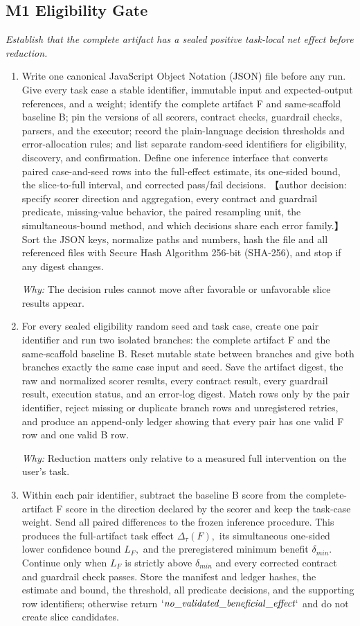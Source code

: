 \documentclass[10pt,a4paper]{article}
\begin{document}
\subsection*{M1 Eligibility Gate}
\emph{Establish that the complete artifact has a sealed positive task-local net effect before reduction.}
\begin{enumerate}[leftmargin=*,start=1]
  \item Write one canonical JavaScript Object Notation (JSON) file before any run. Give every task case a stable identifier, immutable input and expected-output references, and a weight;\allowbreak{} identify the complete artifact F and same-scaffold baseline B;\allowbreak{} pin the versions of all scorers, contract checks, guardrail checks, parsers, and the executor;\allowbreak{} record the plain-language decision thresholds and error-allocation rules;\allowbreak{} and list separate random-seed identifiers for eligibility, discovery, and confirmation. Define one inference interface that converts paired case-and-seed rows into the full-effect estimate, its one-sided bound, the slice-to-full interval, and corrected pass/fail decisions. 【author decision: specify scorer direction and aggregation, every contract and guardrail predicate, missing-value behavior, the paired resampling unit, the simultaneous-bound method, and which decisions share each error family.】 Sort the JSON keys, normalize paths and numbers, hash the file and all referenced files with Secure Hash Algorithm 256-bit (SHA-256), and stop if any digest changes.
\par\emph{Why:} The decision rules cannot move after favorable or unfavorable slice results appear.
  \item For every sealed eligibility random seed and task case, create one pair identifier and run two isolated branches: the complete artifact F and the same-scaffold baseline B. Reset mutable state between branches and give both branches exactly the same case input and seed. Save the artifact digest, the raw and normalized scorer results, every contract result, every guardrail result, execution status, and an error-log digest. Match rows only by the pair identifier, reject missing or duplicate branch rows and unregistered retries, and produce an append-only ledger showing that every pair has one valid F row and one valid B row.
\par\emph{Why:} Reduction matters only relative to a measured full intervention on the user's task.
  \item Within each pair identifier, subtract the baseline B score from the complete-artifact F score in the direction declared by the scorer and keep the task-case weight. Send all paired differences to the frozen inference procedure. This produces the full-artifact task effect \(\Delta _\tau (F),\) its simultaneous one-sided lower confidence bound \(L_{F},\) and the preregistered minimum benefit \(\delta _{min}.\) Continue only when \(L_{F}\) is strictly above \(\delta _{min}\) and every corrected contract and guardrail check passes. Store the manifest and ledger hashes, the estimate and bound, the threshold, all predicate decisions, and the supporting row identifiers;\allowbreak{} otherwise return \(`\mathit{no\_validated\_beneficial\_effect}`\) and do not create slice candidates.

\end{enumerate}
\end{document}
